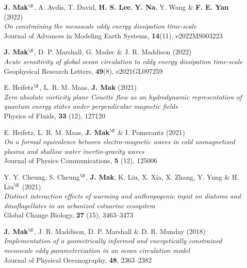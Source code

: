 \documentclass[letterpaper]{article}
\renewenvironment{itemize}{
  \begin{list}{}{
    \setlength{\leftmargin}{1.5em}
  }
}{
  \end{list}
}
\begin{document}
\begin{itemize}
\item[14.] \textbf{J. Mak}$^{\S}$, A. Avdis, T. David, \textbf{H. S. Lee}, \textbf{Y. Na}, Y. Wang \& \textbf{F. E. Yan} (2022)\\
\textit{On constraining the mesoscale eddy energy dissipation time-scale}\\
Journal of Advances in Modeling Earth Systems, \textbf{14}(11), e2022MS003223

\item[13.] \textbf{J. Mak}$^{\S}$, D. P. Marshall, G. Madec \& J. R. Maddison (2022)\\
\textit{Acute sensitivity of global ocean circulation to eddy energy dissipation time-scale}\\
Geophysical Research Letters, \textbf{49}(8), e2021GL097259

\item[12.] E. Heifetz$^{\S}$, L. R. M. Maas, \textbf{J. Mak} (2021)\\
\textit{Zero absolute vorticity plane Couette flow as an hydrodynamic representation of quantum energy states under perpendicular magnetic fields}\\
Physics of Fluids, \textbf{33} (12), 127120

\item[11.] E. Heifetz, L. R. M. Maas, \textbf{J. Mak}$^{\S}$ \& I. Pomerantz (2021)\\
\textit{On a formal equivalence between electro-magnetic waves in cold unmagnetized plasma and shallow water inertio-gravity waves}\\
Journal of Physics Communications, \textbf{5} (12), 125006

\item[10.] Y. Y. Cheung, S. Cheung$^{\S}$, \textbf{J. Mak}, K. Liu, X. Xia, X. Zhang, Y. Yung \& H. Liu$^{\S}$ (2021)\\
\textit{Distinct interaction effects of warming and anthropogenic input on
diatoms and dinoflagellates in an urbanized estuarine ecosystem}\\
Global Change Biology, \textbf{27} (15), 3463--3473

\item[9.] \textbf{J. Mak}$^{\S}$, J. R. Maddison, D. P. Marshall \& D. R. Munday
(2018)\\
\textit{Implementation of a geometrically informed and energetically constrained
mesoscale eddy parameterization in an ocean circulation model}\\
Journal of Physical Oceanography, \textbf{48}, 2363--2382


\end{itemize}
\end{document}
